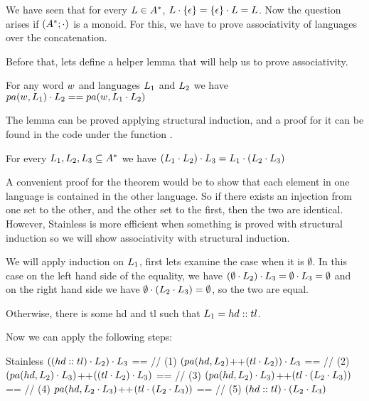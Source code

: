 We have seen that for every $L \in A^{*}$, $L \cdot \{\epsilon\} = \{\epsilon\} \cdot L = L$. Now the question arises if $(A^{*};\cdot)$ is a monoid. For this, we have to prove associativity of languages over the concatenation.

Before that, lets define a helper lemma that will help us to prove associativity. 

\begin{lemma}
	\label{lem:replaceConcatPrepend}
	For any word $w$ and languages $L_{1}$ and $L_{2}$ we have $pa(w, L_{1}) \cdot L_{2} == pa(w, L_{1} \cdot L_{2})$
\end{lemma}

The lemma can be proved applying structural induction, and a proof for it can be found in the code under the function .

\begin{theorem}[Associativity]
	\label{the:associativity}
	For every $L_{1}, L_{2}, L_{3} \subseteq A^{*}$ we have $(L_{1} \cdot L_{2}) \cdot L_{3}  = L_{1} \cdot ( L_{2} \cdot L_{3} )$
\end{theorem}

A convenient proof for the theorem would be to show that each element in one language is contained in the other language. So if there exists an injection from one set to the other, and the other set to the first, then the two are identical. However, Stainless is more efficient when something is proved with structural induction so we will show associativity with structural induction.

We will apply induction on $L_{1}$, first lets examine the case when it is $\emptyset$. In this case on the left hand side of the equality, we have $(\emptyset \cdot L_{2}) \cdot L_{3} = \emptyset \cdot L_{3} = \emptyset$ and on the right hand side we have $\emptyset \cdot ( L_{2} \cdot L_{3} ) = \emptyset$, so the two are equal.

Otherwise, there is some hd and tl such that $L_{1} = hd :: tl$.

Now we can apply the following steps:

\begin{ShortCode}{Stainless}
 $((hd::tl) \cdot L_{2}) \cdot L_{3}$ == // (1)
 $(pa(hd, L_{2}) $++$ (tl \cdot L_{2})) \cdot L_{3}$ == // (2)
 $(pa(hd, L_{2}) \cdot L_{3}) $++$ ((tl \cdot L_{2}) \cdot L_{3})$ == // (3)
 $(pa(hd, L_{2}) \cdot L_{3}) $++$ (tl \cdot (L_{2} \cdot L_{3}))$ == // (4)
 $pa(hd, L_{2} \cdot L_{3}) $++$ (tl \cdot (L_{2} \cdot L_{3}))$ == // (5)
 $(hd::tl) \cdot (L_{2} \cdot L_{3})$
\end{ShortCode}
	
